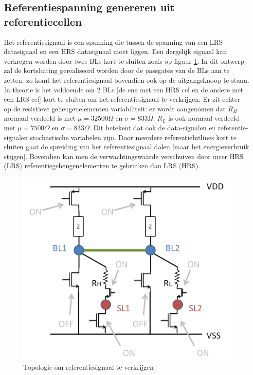 \subsection{Referentiespanning genereren uit referentiecellen}
\label{refread}
Het referentiesignaal is een spanning die tussen de spanning van een LRS datasignaal en een HRS datasignaal moet liggen. Een dergelijk signaal kan verkregen worden door twee BLs kort te sluiten zoals op figuur \ref{fig:2cellref}. In dit ontwerp zal de kortsluiting gerealiseerd worden door de passgates van de BLs aan te zetten, zo komt het referentiesignaal bovendien ook op de uitgangsknoop te staan. In theorie is het voldoende om 2 BLs [de ene met een HRS cel en de andere met een LRS cel] kort te sluiten om het referentiesignaal te verkrijgen. Er zit echter op de resistieve geheugenelementen variabiliteit: er wordt aangenomen dat $R_{H}$ normaal verdeeld is met $\mu = 32500\Omega$ en $\sigma = 833\Omega$. $R_{L}$ is ook normaal verdeeld met $\mu = 7500\Omega$ en $\sigma = 833\Omega$. Dit betekent dat ook de data-signalen en referentie-signalen stochastische variabelen zijn.
Door meerdere referentiebitlines kort te sluiten gaat de spreiding van het referentiesignaal dalen [maar het energieverbruik stijgen]. Bovendien kan men de verwachtingswaarde verschuiven door meer HRS (LRS) referentiegeheugenelementen te gebruiken dan LRS (HRS).

\begin{figure}
  \centering
  \includegraphics[scale=0.3]{../fig/hfdstk-architecture-ref2cell.png}
  \caption[Referentiesignaal uitlezen]{Topologie om referentiesignaal te verkrijgen}
  \label{fig:2cellref}
\end{figure}


